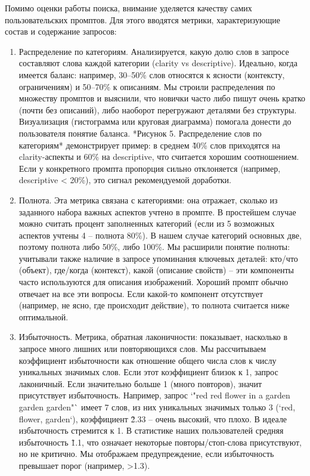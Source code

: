 Помимо оценки работы поиска, внимание уделяется качеству самих пользовательских промптов. Для этого вводятся метрики, характеризующие состав и содержание запросов:
\begin{enumerate}[label=\arabic*.]
\item Распределение по категориям. Анализируется, какую долю слов в запросе составляют слова каждой категории (clarity vs descriptive). Идеально, когда имеется баланс: например, 30–50\% слов относятся к ясности (контексту, ограничениям) и 50–70\% к описаниям. Мы строили распределения по множеству промптов и выяснили, что новички часто либо пишут очень кратко (почти без описаний), либо наоборот перегружают деталями без структуры. Визуализация (гистограмма или круговая диаграмма) помогала донести до пользователя понятие баланса. *Рисунок 5. Распределение слов по категориям* демонстрирует пример: в среднем \~40\% слов приходятся на clarity-аспекты и 60\% на descriptive, что считается хорошим соотношением. Если у конкретного промпта пропорция сильно отклоняется (например, descriptive < 20\%), это сигнал рекомендуемой доработки.
\item Полнота. Эта метрика связана с категориями: она отражает, сколько из заданного набора важных аспектов учтено в промпте. В простейшем случае можно считать процент заполненных категорий (если из 5 возможных аспектов учтены 4 – полнота 80\%). В нашем случае категорий основных две, поэтому полнота либо 50\%, либо 100\%. Мы расширили понятие полноты: учитывали также наличие в запросе упоминания ключевых деталей: кто/что (объект), где/когда (контекст), какой (описание свойств) – эти компоненты часто используются для описания изображений. Хороший промпт обычно отвечает на все эти вопросы. Если какой-то компонент отсутствует (например, не ясно, где происходит действие), то полнота считается ниже оптимальной.
\item Избыточность. Метрика, обратная лаконичности: показывает, насколько в запросе много лишних или повторяющихся слов. Мы рассчитываем коэффициент избыточности как отношение общего числа слов к числу уникальных значимых слов. Если этот коэффициент близок к 1, запрос лаконичный. Если значительно больше 1 (много повторов), значит присутствует избыточность. Например, запрос `"red red flower in a garden garden garden"` имеет 7 слов, из них уникальных значимых только 3 (`red, flower, garden`), коэффициент \~2.33 – очень высокий, что плохо. В идеале избыточность стремится к 1. В статистике наших пользователей средняя избыточность \~1.1, что означает некоторые повторы/стоп-слова присутствуют, но не критично. Мы отображаем предупреждение, если избыточность превышает порог (например, >1.3).

\end{enumerate}
